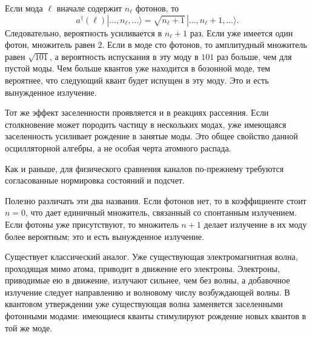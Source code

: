 Если мода \(\ell\) вначале содержит \(n_\ell\) фотонов, то
\begin{equation}
a^\dagger(\ell)
|\ldots,n_\ell,\ldots\rangle
=
\sqrt{n_\ell+1}
\,|\ldots,n_\ell+1,\ldots\rangle.
\end{equation}
Следовательно, вероятность усиливается в \(n_\ell+1\) раз. Если уже имеется один фотон, множитель равен \(2\). Если в моде сто фотонов, то амплитудный множитель равен \(\sqrt{101}\), а вероятность испускания в эту моду в \(101\) раз больше, чем для пустой моды. Чем больше квантов уже находится в бозонной моде, тем вероятнее, что следующий квант будет испущен в эту моду. Это и есть вынужденное излучение.

Тот же эффект заселенности проявляется и в реакциях рассеяния. Если столкновение может породить частицу в нескольких модах, уже имеющаяся заселенность усиливает рождение в занятые моды. Это общее свойство данной осцилляторной алгебры, а не особая черта атомного распада.

\begin{classroomqa}
\end{classroomqa}

Как и раньше, для физического сравнения каналов по-прежнему требуются согласованные нормировка состояний и подсчет.

\begin{classroomqa}
\end{classroomqa}

Полезно различать эти два названия. Если фотонов нет, то в коэффициенте стоит \(n=0\), что дает единичный множитель, связанный со спонтанным излучением. Если фотоны уже присутствуют, то множитель \(n+1\) делает излучение в их моду более вероятным; это и есть вынужденное излучение.

Существует классический аналог. Уже существующая электромагнитная волна, проходящая мимо атома, приводит в движение его электроны. Электроны, приводимые ею в движение, излучают сильнее, чем без волны, а добавочное излучение следует направлению и волновому числу возбуждающей волны. В квантовом утверждении уже существующая волна заменяется заселенными фотонными модами: имеющиеся кванты стимулируют рождение новых квантов в той же моде.

